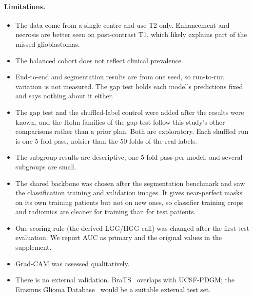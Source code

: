 \documentclass[11pt]{article}
\begin{document}
\paragraph{Limitations.}
\begin{itemize}
  \item The data come from a single centre and use T2 only. Enhancement and necrosis are better seen on
        post-contrast T1, which likely explains part of the missed glioblastomas.
  \item The balanced cohort does not reflect clinical prevalence.
  \item End-to-end and segmentation results are from one seed, so run-to-run variation is not measured. The gap test
        holds each model's predictions fixed and says nothing about it either.
  \item The gap test and the shuffled-label control were added after the results were known, and the Holm families of
        the gap test follow this study's other comparisons rather than a prior plan. Both are exploratory. Each shuffled
        run is one 5-fold pass, noisier than the 50 folds of the real labels.
  \item The subgroup results are descriptive, one 5-fold pass per model, and several subgroups are small.
  \item The shared backbone was chosen after the segmentation benchmark and saw the classification training and
        validation images. It gives near-perfect masks on its own training patients but not on new ones, so
        classifier training crops and radiomics are cleaner for training than for test patients.
  \item One scoring rule (the derived LGG/HGG call) was changed after the first test evaluation. We report AUC as
        primary and the original values in the supplement.
  \item Grad-CAM was assessed qualitatively.
  \item There is no external validation. BraTS~\cite{menze2015brats,baid2021brats} overlaps with UCSF-PDGM; the
        Erasmus Glioma Database~\cite{vandervoort2021egd} would be a suitable external test set.
\end{itemize}

\end{document}
